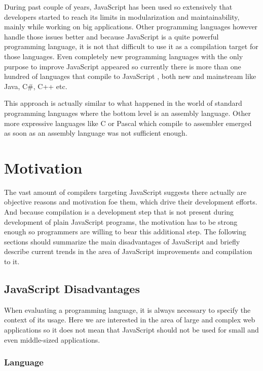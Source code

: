 \documentclass[12pt,a4paper]{report}
\begin{document}
During past couple of years, JavaScript has been used so extensively that developers started to reach its limits in modularization and maintainability, mainly while working on big applications. Other programming languages however handle those issues better and because JavaScript is a quite powerful programming language, it is not that difficult to use it as a compilation target for those languages. Even completely new programming languages with the only purpose to improve JavaScript appeared so currently there is more than one hundred of languages that compile to JavaScript \cite{Backends}, both new and mainstream like Java, C\#, C++ etc.

This approach is actually similar to what happened in the world of standard programming languages where the bottom level is an assembly language. Other more expressive languages like C or Pascal which compile to assembler emerged as soon as an assembly language was not sufficient enough.

\section{Motivation}
\label{sec:Motivation}

The vast amount of compilers targeting JavaScript suggests there actually are objective reasons and motivation foe them, which drive their development efforts. And because compilation is a development step that is not present during development of plain JavaScript programs, the motivation has to be strong enough so programmers are willing to bear this additional step. The following sections should summarize the main disadvantages of JavaScript and briefly describe current trends in the area of JavaScript improvements and compilation to it.

\subsection{JavaScript Disadvantages}

When evaluating a programming language, it is always necessary to specify the context of its usage. Here we are interested in the area of large and complex web applications so it does not mean that JavaScript should not be used for small and even middle-sized applications.

\subsubsection*{Language} 
\end{document}
